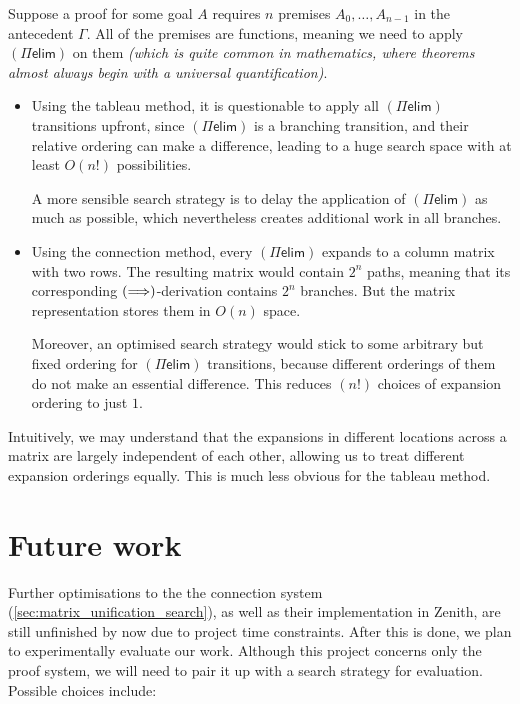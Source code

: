 \documentclass[twoside]{report}
\begin{document}
\begin{example}
    Suppose a proof for some goal $A$ requires $n$ premises $A_0, \ldots, A_{n-1}$ in the antecedent $\Gamma$. All of the premises are functions, meaning we need to apply $(\Pi\mathsf{elim})$ on them \emph{(which is quite common in mathematics, where theorems almost always begin with a universal quantification)}.

    \begin{itemize}
        \item Using the tableau method, it is questionable to apply all $(\Pi\mathsf{elim})$ transitions upfront, since $(\Pi\mathsf{elim})$ is a branching transition, and their relative ordering can make a difference, leading to a huge search space with at least $O(n!)$ possibilities.

              A more sensible search strategy is to delay the application of $(\Pi\mathsf{elim})$ as much as possible, which nevertheless creates additional work in all branches.

        \item Using the connection method, every $(\Pi\mathsf{elim})$ expands to a column matrix with two rows. The resulting matrix would contain $2^n$ paths, meaning that its corresponding $(\Longrightarrow)$-derivation contains $2^n$ branches. But the matrix representation stores them in $O(n)$ space.

              Moreover, an optimised search strategy would stick to some arbitrary but fixed ordering for $(\Pi\mathsf{elim})$ transitions, because different orderings of them do not make an essential difference. This reduces $(n!)$ choices of expansion ordering to just $1$.
    \end{itemize}

    Intuitively, we may understand that the expansions in different locations across a matrix are largely independent of each other, allowing us to treat different expansion orderings equally. This is much less obvious for the tableau method.
\end{example}

\section{Future work}
\label{sec:evaluation_future_works}

Further optimisations to the the connection system (\cref{sec:matrix_unification_search}), as well as their implementation in Zenith, are still unfinished by now due to project time constraints. After this is done, we plan to experimentally evaluate our work. Although this project concerns only the proof system, we will need to pair it up with a search strategy for evaluation. Possible choices include:
\end{document}
